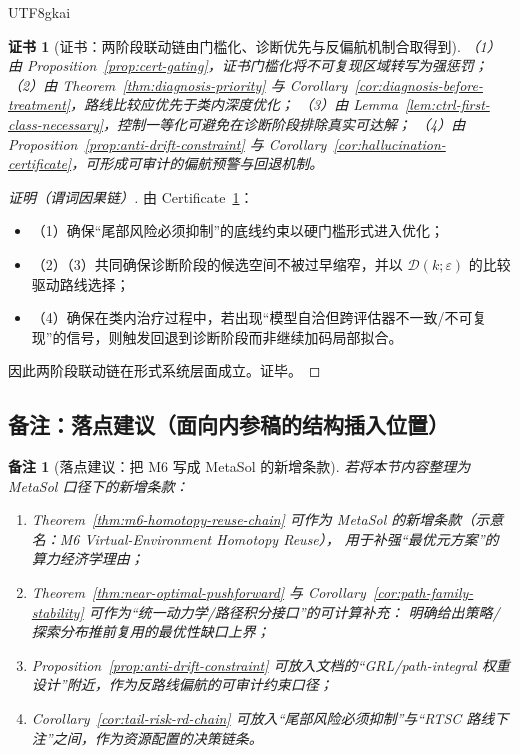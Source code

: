 \documentclass[12pt]{article}
\newtheorem{remark}{备注}[section]
\newtheorem{certificate}{证书}[section]
\newcommand{\RTSC}{\textsf{RTSC}}
\begin{document}
\begin{CJK*}{UTF8}{gkai}
\begin{certificate}[证书：两阶段联动链由门槛化、诊断优先与反偏航机制合取得到]
\label{cert:tail-risk-rd-chain}
（1）由 Proposition~\ref{prop:cert-gating}，证书门槛化将不可复现区域转写为强惩罚；
（2）由 Theorem~\ref{thm:diagnosis-priority} 与 Corollary~\ref{cor:diagnosis-before-treatment}，路线比较应优先于类内深度优化；
（3）由 Lemma~\ref{lem:ctrl-first-class-necessary}，控制一等化可避免在诊断阶段排除真实可达解；
（4）由 Proposition~\ref{prop:anti-drift-constraint} 与 Corollary~\ref{cor:hallucination-certificate}，可形成可审计的偏航预警与回退机制。
\end{certificate}

\begin{proof}[证明（谓词因果链）]
由 Certificate~\ref{cert:tail-risk-rd-chain}：
\begin{itemize}
  \item（1）确保“尾部风险必须抑制”的底线约束以硬门槛形式进入优化；
  \item（2）（3）共同确保诊断阶段的候选空间不被过早缩窄，并以 $\mathcal{D}(k;\varepsilon)$ 的比较驱动路线选择；
  \item（4）确保在类内治疗过程中，若出现“模型自洽但跨评估器不一致/不可复现”的信号，则触发回退到诊断阶段而非继续加码局部拟合。
\end{itemize}
因此两阶段联动链在形式系统层面成立。证毕。
\end{proof}

\subsection{备注：落点建议（面向内参稿的结构插入位置）}

\begin{remark}[落点建议：把 M6 写成 \textsf{MetaSol} 的新增条款]
若将本节内容整理为 \textsf{MetaSol} 口径下的新增条款：
\begin{enumerate}
  \item Theorem~\ref{thm:m6-homotopy-reuse-chain} 可作为 \textsf{MetaSol} 的新增条款（示意名：M6 Virtual-Environment Homotopy Reuse），
    用于补强“最优元方案”的算力经济学理由；
  \item Theorem~\ref{thm:near-optimal-pushforward} 与 Corollary~\ref{cor:path-family-stability} 可作为“统一动力学/路径积分接口”的可计算补充：
    明确给出策略/探索分布推前复用的最优性缺口上界；
  \item Proposition~\ref{prop:anti-drift-constraint} 可放入文档的“GRL/path-integral 权重设计”附近，作为反路线偏航的可审计约束口径；
  \item Corollary~\ref{cor:tail-risk-rd-chain} 可放入“尾部风险必须抑制”与“\RTSC{} 路线下注”之间，作为资源配置的决策链条。
\end{enumerate}
\end{remark}


\end{CJK*}
\end{document}
